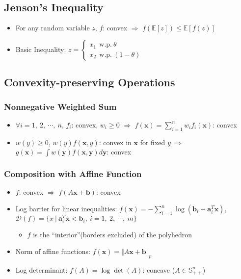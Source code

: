 \subsection{Jenson's Inequality}
\begin{itemize}
    \item For any random variable $z$, $f$: convex $\Rightarrow$ $f(\mathbb{E}[z]) \leq \mathbb{E}[f(z)]$
    \item Basic Inequality: $z = \begin{cases} x_1~~\mathrm{w.p.}~\theta \\ x_2~~\mathrm{w.p.}~(1-\theta) \end{cases}$
\end{itemize}

\subsection{Convexity-preserving Operations}

\subsubsection*{Nonnegative Weighted Sum}
\begin{itemize}
    \item $\forall i=1,~2,~\cdots,~n$, $f_i$: convex, $w_i \geq 0$ $\Rightarrow$
        $f(\mathbf{x}) = \sum_{i=1}^n w_i f_i (\mathbf{x})$: convex
    \item $w(y) \geq 0$, $w(y) f(\mathbf{x},y)$: convex in $\mathbf{x}$ for fixed $y$ $\Rightarrow$
        $g(\mathbf{x}) = \int w(\mathbf{y}) f(\mathbf{x}, \mathbf{y}) d\mathbf{y}$: convex
\end{itemize}

\subsubsection*{Composition with Affine Function}
\begin{itemize}
    \item $f$: convex $\Rightarrow$ $f(A\mathbf{x} + \mathbf{b})$: convex
    \item Log barrier for linear inequalities:
        $f(\mathbf{x}) = - \sum_{i=1}^n \log (\mathbf{b}_i - \mathbf{a}_i^T \mathbf{x})$,
        $\mathcal{D}(f) = \{x~|~\mathbf{a}_i^T \mathbf{x} < \mathbf{b}_i,~i=1,~2,~\cdots,~m\}$
    \begin{itemize}
        \item $f$ is the ``interior''(borders excluded) of the polyhedron
    \end{itemize}
    \item Norm of affine functions: $f(\mathbf{x}) = \Vert A\mathbf{x} + \mathbf{b} \Vert_p$
    \item Log determinant: $f(A) = \log \det (A)$: concave ($A \in \mathbb{S}^n_{++}$)
\end{itemize}

